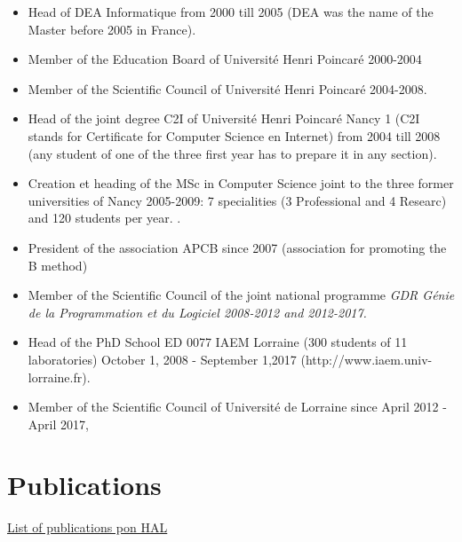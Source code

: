 \documentclass[ 12pt]{article}
\begin{document}
\begin{itemize}
  


\item Head of  DEA Informatique from  2000 till 2005 (DEA  was the name of the Master before 2005 in France).

\item Member of the Education Board of Universit\'e Henri Poincar\'e 2000-2004

\item Member of the Scientific Council of Universit\'e Henri Poincar\'e 2004-2008.


\item Head of  the joint degree  C2I of Universit\'e Henri Poincar\'e Nancy 1 (C2I stands  for Certificate for Computer Science en Internet)  from 2004 till 2008 (any student of one of the three first year has to prepare it in any  section). 

\item Creation et heading of the MSc in Computer Science joint to the three former  universities of Nancy  2005-2009: 7 specialities  (3 Professional  and 4 Researc) and  120 
students per year.
.

\item President of the association APCB since 2007 (association for promoting the B method)



\item  Member of the Scientific Council of the joint  national programme  \textit{GDR G\'enie de la Programmation et du Logiciel 2008-2012 and 2012-2017.}

\item Head of the PhD School ED 0077   IAEM Lorraine  (300 students of 11 laboratories)  October 1, 2008 - September 1,2017  (http://www.iaem.univ-lorraine.fr).

\item Member of the Scientific Council of Universit\'e de Lorraine  since  April  2012 - April 2017,

\end{itemize}

\section{Publications }
\label{sec:publications-}



 \href{https://haltools.inria.fr/Public/afficheRequetePubli.php?auteur_exp=dominique%2Cmery&annee_publideb=1980&annee_publifin=2024&CB_auteur=oui&CB_titre=oui&CB_article=oui&langue=Anglais&tri_exp=annee_publi&tri_exp2=typdoc&tri_exp3=date_publi&ordre_aff=TA&Fen=Aff&css=../css/VisuRubriqueEncadre.css}{List
   of publications pon HAL}

 

%



\end{document}
